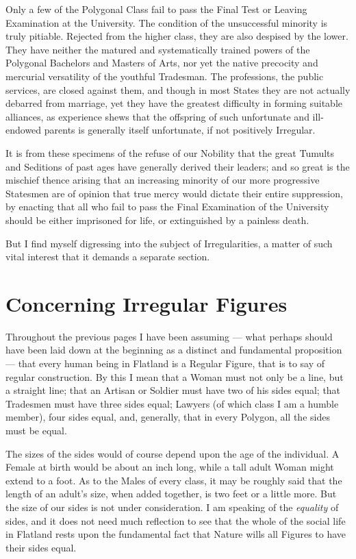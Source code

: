 \documentclass[10pt, kindle, oneside]{kindle}
\begin{document}
Only a few of the Polygonal Class fail to pass the Final Test or Leaving
Examination at the University. The condition of the unsuccessful minority is
truly pitiable.  Rejected from the higher class, they are also despised by the
lower. They have neither the matured and systematically trained powers of the
Polygonal Bachelors and Masters of Arts, nor yet the native precocity and
mercurial versatility of the youthful Tradesman. The professions, the public
services, are closed against them, and though in most States they are not
actually debarred from marriage, yet they have the greatest difficulty in
forming suitable alliances, as experience shews that the offspring of such
unfortunate and ill-endowed parents is generally itself unfortunate, if not
positively Irregular.

It is from these specimens of the refuse of our Nobility that the great
Tumults and Seditions of past ages have generally derived their leaders; and
so great is the mischief thence arising that an increasing minority of our
more progressive Statesmen are of opinion that true mercy would dictate their
entire suppression, by enacting that all who fail to pass the Final
Examination of the University should be either imprisoned for life, or
extinguished by a painless death.

But I find myself digressing into the subject of Irregularities, a matter of
such vital interest that it demands a separate section.


\chapter{Concerning Irregular Figures}


Throughout the previous pages I have been assuming --- what perhaps should have
been laid down at the beginning as a distinct and fundamental proposition ---
that every human being in Flatland is a Regular Figure, that is to say of
regular construction. By this I mean that a Woman must not only be a line, but
a straight line; that an Artisan or Soldier must have two of his sides equal;
that Tradesmen must have three sides equal; Lawyers (of which class I am a
humble member), four sides equal, and, generally, that in every Polygon, all
the sides must be equal.

The sizes of the sides would of course depend upon the age of the individual.
A Female at birth would be about an inch long, while a tall adult Woman might
extend to a foot. As to the Males of every class, it may be roughly said that
the length of an adult's size, when added together, is two feet or a little
more. But the size of our sides is not under consideration. I am speaking of
the \emph{equality} of sides, and it does not need much reflection to see that the
whole of the social life in Flatland rests upon the fundamental fact that
Nature wills all Figures to have their sides equal.
\end{document}
